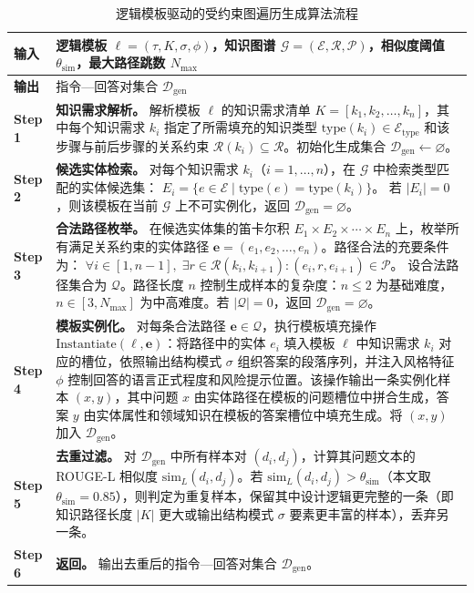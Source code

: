 \documentclass[fontset=fandol,type=master,campus=shenzhen,etitleauto=true]{hithesisbook}
\begin{document}
\renewcommand{\arraystretch}{1.15}
\begin{longtable}{p{2.0cm}p{11.5cm}}
\caption{逻辑模板驱动的受约束图遍历生成算法流程}\label{tab:graph-traversal-alg}\\
\toprule
\textbf{输入} & 逻辑模板 $\ell = (\tau, K, \sigma, \phi)$，知识图谱 $\mathcal{G} = (\mathcal{E}, \mathcal{R}, \mathcal{P})$，相似度阈值 $\theta_{\text{sim}}$，最大路径跳数 $N_{\max}$ \\
\midrule
\textbf{输出} & 指令---回答对集合 $\mathcal{D}_{\text{gen}}$ \\
\midrule
\textbf{Step 1} & \textbf{知识需求解析。} 解析模板 $\ell$ 的知识需求清单 $K = [k_1, k_2, \ldots, k_n]$，其中每个知识需求 $k_i$ 指定了所需填充的知识类型 $\text{type}(k_i) \in \mathcal{E}_{\text{type}}$ 和该步骤与前后步骤的关系约束 $\mathcal{R}(k_i) \subseteq \mathcal{R}$。初始化生成集合 $\mathcal{D}_{\text{gen}} \leftarrow \varnothing$。\\
\midrule
\textbf{Step 2} & \textbf{候选实体检索。} 对每个知识需求 $k_i$（$i = 1, \ldots, n$），在 $\mathcal{G}$ 中检索类型匹配的实体候选集：
$E_i = \{e \in \mathcal{E} \mid \text{type}(e) = \text{type}(k_i)\}$。
若 $|E_i| = 0$，则该模板在当前 $\mathcal{G}$ 上不可实例化，返回 $\mathcal{D}_{\text{gen}} = \varnothing$。\\
\midrule
\textbf{Step 3} & \textbf{合法路径枚举。} 在候选实体集的笛卡尔积 $E_1 \times E_2 \times \cdots \times E_n$ 上，枚举所有满足关系约束的实体路径 $\mathbf{e} = (e_1, e_2, \ldots, e_n)$。路径合法的充要条件为：
$\forall i \in [1, n-1],\; \exists r \in \mathcal{R}(k_i, k_{i+1}): (e_i, r, e_{i+1}) \in \mathcal{P}$。
设合法路径集合为 $\mathcal{Q}$。路径长度 $n$ 控制生成样本的复杂度：$n \leq 2$ 为基础难度，$n \in [3, N_{\max}]$ 为中高难度。若 $|\mathcal{Q}| = 0$，返回 $\mathcal{D}_{\text{gen}} = \varnothing$。\\
\midrule
\textbf{Step 4} & \textbf{模板实例化。} 对每条合法路径 $\mathbf{e} \in \mathcal{Q}$，执行模板填充操作 $\text{Instantiate}(\ell, \mathbf{e})$：将路径中的实体 $e_i$ 填入模板 $\ell$ 中知识需求 $k_i$ 对应的槽位，依照输出结构模式 $\sigma$ 组织答案的段落序列，并注入风格特征 $\phi$ 控制回答的语言正式程度和风险提示位置。该操作输出一条实例化样本 $(x, y)$，其中问题 $x$ 由实体路径在模板的问题槽位中拼合生成，答案 $y$ 由实体属性和领域知识在模板的答案槽位中填充生成。将 $(x, y)$ 加入 $\mathcal{D}_{\text{gen}}$。\\
\midrule
\textbf{Step 5} & \textbf{去重过滤。} 对 $\mathcal{D}_{\text{gen}}$ 中所有样本对 $(d_i, d_j)$，计算其问题文本的 ROUGE-L 相似度 $\text{sim}_L(d_i, d_j)$\cite{ref75}。若 $\text{sim}_L(d_i, d_j) > \theta_{\text{sim}}$（本文取 $\theta_{\text{sim}} = 0.85$），则判定为重复样本，保留其中设计逻辑更完整的一条（即知识路径长度 $|K|$ 更大或输出结构模式 $\sigma$ 要素更丰富的样本），丢弃另一条。\\
\midrule
\textbf{Step 6} & \textbf{返回。} 输出去重后的指令---回答对集合 $\mathcal{D}_{\text{gen}}$。\\
\bottomrule
\end{longtable}
\end{document}

